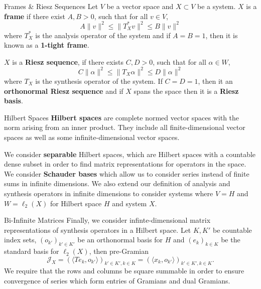 \documentclass{beamer}
\begin{document}
\begin{frame}{Frames \& Riesz Sequences}
    Let $V$ be a vector space and $X \subset V$ be a system. $X$ is a \textbf{frame} if there exist $A, B > 0$, such that for all $v \in V$,
\begin{equation} \label{frameBounds}
    A \| v \|^2 \leq \| T_X^*v \|^2 \leq B\|v\|^2
\end{equation}
where $T_X^*$ is the analysis operator of the system and if $A = B = 1$, then it is known as a \textbf{1-tight frame}.

$X$ is a \textbf{Riesz sequence}, if there exists $C, D > 0$, such that for all $\alpha \in W$,
\begin{equation} \label{RieszBounds}
    C \| \alpha \|^2 \leq \| T_X\alpha \|^2 \leq D\|\alpha\|^2
\end{equation}
where $T_X$ is the synthesis operator of the system. If $C = D = 1$, then it an \textbf{orthonormal Riesz sequence} and if $X$ spans the space then it is a \textbf{Riesz basis}.
\end{frame}

\begin{frame}{Hilbert Spaces}
    \textbf{Hilbert spaces} are complete normed vector spaces with the norm arising from an inner product. They include all finite-dimensional vector spaces as well as some infinite-dimensional vector spaces.
    
    We consider \textbf{separable} Hilbert spaces, which are Hilbert spaces with a countable dense subset in order to find matrix representations for operators in the space. We consider \textbf{Schauder bases} which allow us to consider series instead of finite sums in infinite dimensions. We also extend our definition of analysis and synthesis operators in infinite dimensions to consider systems where $V = H$ and $W = \ell_2(X)$ for Hilbert space $H$ and system $X$. 
\end{frame}

\begin{frame}{Bi-Infinite Matrices}
    Finally, we consider infinte-dimensional matrix representations of synthesis operators in a Hilbert space. Let $K, K'$ be countable index sets,  $(o_{k'})_{k' \in K'}$ be an orthonormal basis for $H$ and $(e_k)_{k \in K}$ be the standard basis for $\ell_2(X)$, then pre-Gramian
    \begin{equation} \label{inf_pre_gram}
    \mathcal{J}_X = \left(\langle Te_k, o_{k'} \rangle \right)_{k' \in K', k \in K} = \left(\langle x_k, o_{k'} \rangle \right)_{k' \in K', k \in K}.
\end{equation}
We require that the rows and columns be square summable in order to ensure convergence of series which form entries of Gramians and dual Gramians.
\end{frame}
\end{document}
